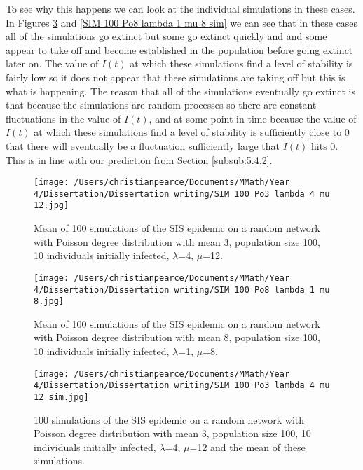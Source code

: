 \documentclass{uonmathsreport}
\begin{document}
To see why this happens we can look at the individual simulations in these cases. In Figures \ref{SIM 100 Po3 lambda 4 mu 12 sim} and \ref{SIM 100 Po8 lambda 1 mu 8 sim} we can see that in these cases all of the simulations  go extinct but some go extinct quickly and and some appear to take off and become established in the population before going extinct later on. The value of $I(t)$ at which these simulations find a level of stability is fairly low so it does not appear that these simulations are taking off but this is what is happening. The reason that all of the simulations eventually go extinct is that because the simulations are random processes so there are constant fluctuations in the value of $I(t)$, and at some point in time because the value of $I(t)$ at which these simulations find a level of stability is sufficiently close to $0$ that there will eventually be a fluctuation sufficiently large that $I(t)$ hits $0$. This is in line with our prediction from Section \ref{subsub:5.4.2}.

\begin{figure}
\begin{center}
\texttt{[image: /Users/christianpearce/Documents/MMath/Year 4/Dissertation/Dissertation writing/SIM 100 Po3 lambda 4 mu 12.jpg]}
\end{center}
\caption{Mean of 100 simulations of the SIS epidemic on a random network with Poisson degree distribution with mean 3, population size 100, 10 individuals initially infected, $\lambda$=4, $\mu$=12.}
\label{SIM 100 Po3 lambda 4 mu 12}
\end{figure}

\begin{figure}
\begin{center}
\texttt{[image: /Users/christianpearce/Documents/MMath/Year 4/Dissertation/Dissertation writing/SIM 100 Po8 lambda 1 mu 8.jpg]}
\end{center}
\caption{Mean of 100 simulations of the SIS epidemic on a random network with Poisson degree distribution with mean 8, population size 100, 10 individuals initially infected, $\lambda$=1, $\mu$=8.}
\label{SIM 100 Po8 lambda 1 mu 8}
\end{figure}

\begin{figure}
\begin{center}
\texttt{[image: /Users/christianpearce/Documents/MMath/Year 4/Dissertation/Dissertation writing/SIM 100 Po3 lambda 4 mu 12 sim.jpg]}
\end{center}
\caption{100 simulations of the SIS epidemic on a random network with Poisson degree distribution with mean 3, population size 100, 10 individuals initially infected, $\lambda$=4, $\mu$=12 and the mean of these simulations.}
\label{SIM 100 Po3 lambda 4 mu 12 sim}
\end{figure}
\end{document}
